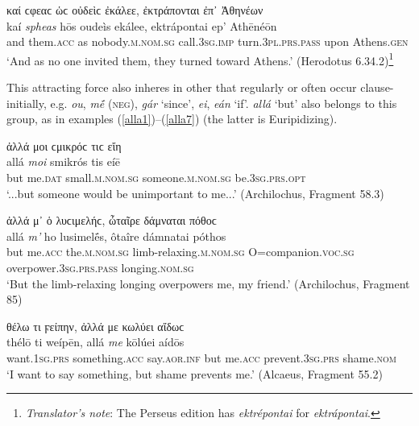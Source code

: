 \begin{exe}
\ex καί ϲφεαϲ ὡϲ οὐδεὶϲ ἐκάλεε, ἐκτράπονται ἐπ᾽ Ἀθηνέων\\
\gll kaí \emph{spheas} hōs oudeìs ekálee, ektrápontai ep' Athēnéōn\\
and them.\textsc{acc} as nobody.\textsc{m.nom.sg} call.\textsc{3sg.imp} turn.\textsc{3pl.prs.pass} upon Athens.\textsc{gen}\\
\trans `And as no one invited them, they turned toward Athens.' (Herodotus 6.34.2)\footnote{\emph{Translator's note}: The Perseus edition has \textit{ektrépontai} for \textit{ektrápontai}.}
\label{kaispheas2}
\end{exe}

This attracting force also inheres in other  that regularly or often occur clause-initially, e.g. \textit{ou}, \textit{mḗ} (\textsc{neg}), \textit{gár} `since', \textit{ei}, \textit{eán} `if'. \textit{allá} `but' also belongs to this group, as in examples (\ref{alla1})--(\ref{alla7}) (the latter is Euripidizing).

\begin{exe}
\ex ἀλλά μοι ϲμικρόϲ τιϲ εἴη\\
\gll allá \emph{moi} smikrós tis eíē\\
but me.\textsc{dat} small.\textsc{m.nom.sg} someone.\textsc{m.nom.sg} be.\textsc{3sg.prs.opt}\\
\trans `...but someone would be unimportant to me...' (Archilochus, Fragment 58.3)
\label{alla1}
\end{exe}

\begin{exe}
\ex ἀλλά μ᾽ ὁ λυϲιμελήϲ, ὦταῖρε δάμναται πόθοϲ\\
\gll allá \emph{m'} ho lusimelḗs, ôtaîre dámnatai póthos\\
but me.\textsc{acc} the.\textsc{m.nom.sg} limb-relaxing.\textsc{m.nom.sg} O=companion.\textsc{voc.sg} overpower.\textsc{3sg.prs.pass} longing.\textsc{nom.sg}\\
\trans `But the limb-relaxing longing overpowers me, my friend.' (Archilochus, Fragment 85)
\label{alla2}
\end{exe}

\begin{exe}
\ex θέλω τι ϝείπην, ἀλλά με κωλύει αἴδωϲ\\
\gll thélō ti weípēn, allá \emph{me} kōlúei aídōs\\
want.\textsc{1sg.prs} something.\textsc{acc} say.\textsc{aor.inf} but me.\textsc{acc} prevent.\textsc{3sg.prs} shame.\textsc{nom}\\
\trans `I want to say something, but shame prevents me.' (Alcaeus, Fragment 55.2)
\label{alla3}
\end{exe}

